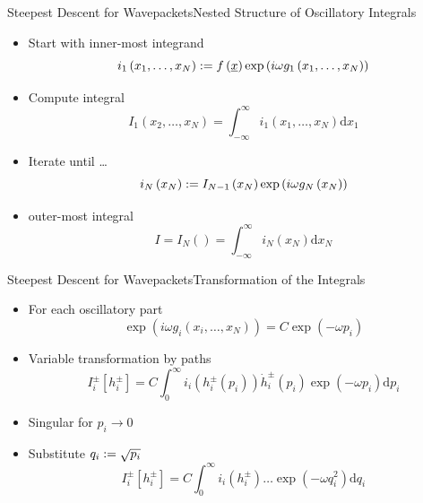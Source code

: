 \documentclass{beamer}
\begin{document}
\begin{frame}{Steepest Descent for Wavepackets}{Nested Structure of Oscillatory Integrals}
  \begin{itemize}
    \item Start with inner-most integrand
    \begin{equation*}
      i_1\left(x_1,\ldots,x_N\right) := f\left(\underline{x}\right) \exp\left(i\omega g_1\left(x_1,\ldots,x_N\right)\right)
    \end{equation*}
    \item Compute integral
    \begin{equation*}
      I_1\left(x_2,\ldots,x_N\right) = \int_{-\infty}^\infty i_1\left(x_1,\ldots,x_N\right) \mathrm{d}x_1
    \end{equation*}
    \item Iterate until \ldots
    \begin{equation*}
      i_N\left(x_N\right) := I_{N-1}\left(x_N\right) \exp\left(i\omega g_N\left(x_N\right)\right)
    \end{equation*}
    \item outer-most integral
    \begin{equation*}
      I = I_N\left(\right) = \int_{-\infty}^\infty i_N\left(x_N\right) \mathrm{d}x_N
    \end{equation*}
  \end{itemize}
\end{frame}


\begin{frame}{Steepest Descent for Wavepackets}{Transformation of the Integrals}
  \begin{itemize}
    \item For each oscillatory part
    \begin{equation*}
      \exp\left(i\omega g_i\left(x_i,\ldots,x_N\right)\right)
      =
      C
      \exp\left(- \omega p_i\right)
    \end{equation*}
    \item Variable transformation by paths
    \begin{equation*}
        I_i^{\pm}[h_i^{\pm}] =
        C
        \int_0^\infty
          i_i\left(h_i^{\pm}\left(p_i\right)\right)
          \dot{h}_i^{\pm}\left(p_i\right)
          \exp\left(- \omega p_i\right)
        \mathrm{d}p_i
    \end{equation*}
    \item Singular for $p_i \rightarrow 0$
    \item Substitute $q_i := \sqrt{p_i}$
    \begin{equation*}
        I_i^{\pm}[h_i^{\pm}] =
        C
        \int_0^\infty
          i_i\left(h_i^{\pm}\right)
          \ldots
          \exp\left(- \omega q_i^2\right)
        \mathrm{d}q_i
    \end{equation*}
  \end{itemize}
\end{frame}
\end{document}
